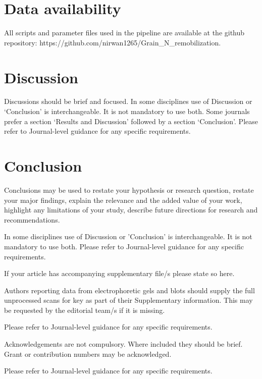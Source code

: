 \documentclass[pdflatex,sn-mathphys-num]{sn-jnl}%
\theoremstyle{thmstyleone}%
\theoremstyle{thmstyletwo}%
\theoremstyle{thmstylethree}%
\begin{document}
\section{Data availability}
All scripts and parameter files used in the pipeline are available at the github repository: https://github.com/nirwan1265/Grain\_N\_remobilization.


\section{Discussion}\label{sec12}

Discussions should be brief and focused. In some disciplines use of Discussion or `Conclusion' is interchangeable. It is not mandatory to use both. Some journals prefer a section `Results and Discussion' followed by a section `Conclusion'. Please refer to Journal-level guidance for any specific requirements. 

\section{Conclusion}\label{sec13}

Conclusions may be used to restate your hypothesis or research question, restate your major findings, explain the relevance and the added value of your work, highlight any limitations of your study, describe future directions for research and recommendations. 

In some disciplines use of Discussion or 'Conclusion' is interchangeable. It is not mandatory to use both. Please refer to Journal-level guidance for any specific requirements. 

\backmatter


If your article has accompanying supplementary file/s please state so here. 

Authors reporting data from electrophoretic gels and blots should supply the full unprocessed scans for key as part of their Supplementary information. This may be requested by the editorial team/s if it is missing.

Please refer to Journal-level guidance for any specific requirements.


Acknowledgements are not compulsory. Where included they should be brief. Grant or contribution numbers may be acknowledged.

Please refer to Journal-level guidance for any specific requirements.
\end{document}
